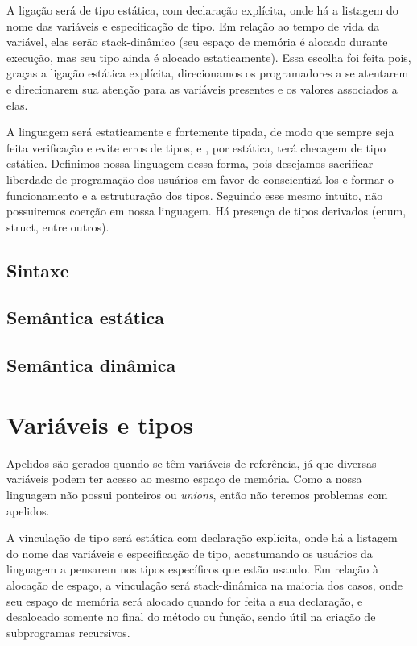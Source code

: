 A ligação será de tipo estática, com declaração explícita, onde há a listagem
do nome das variáveis e especificação de tipo. Em relação ao tempo de vida da
variável, elas serão stack-dinâmico (seu espaço de memória é alocado durante
execução, mas seu tipo ainda é alocado estaticamente). Essa escolha foi feita
pois, graças a ligação estática explícita, direcionamos os programadores a se
atentarem e direcionarem sua atenção para as variáveis presentes e os valores
associados a elas.

A linguagem será estaticamente e fortemente tipada, de modo que sempre seja
feita verificação e evite erros de tipos, e , por estática, terá checagem de
tipo estática. Definimos nossa linguagem dessa forma, pois desejamos sacrificar
liberdade de programação dos usuários em favor de conscientizá-los e formar o
funcionamento e a estruturação dos tipos. Seguindo esse mesmo intuito, não
possuiremos coerção em nossa linguagem. Há presença de tipos derivados (enum,
struct, entre outros).

\subsection{Sintaxe}
\subsection{Semântica estática}
\subsection{Semântica dinâmica}

\section{Variáveis e tipos}
Apelidos são gerados quando se têm variáveis de referência, já que diversas
variáveis podem ter acesso ao mesmo espaço de memória. Como a nossa linguagem
não possui ponteiros ou \emph{unions}, então não teremos problemas com apelidos.


A vinculação de tipo será estática com declaração explícita, onde há a listagem
do nome das variáveis e especificação de tipo, acostumando os usuários da
linguagem a pensarem nos tipos específicos que estão usando. Em relação à
alocação de espaço, a vinculação será stack-dinâmica na maioria dos casos, onde
seu espaço de memória será alocado quando for feita a sua declaração, e
desalocado somente no final do método ou função, sendo útil na criação de
subprogramas recursivos.

